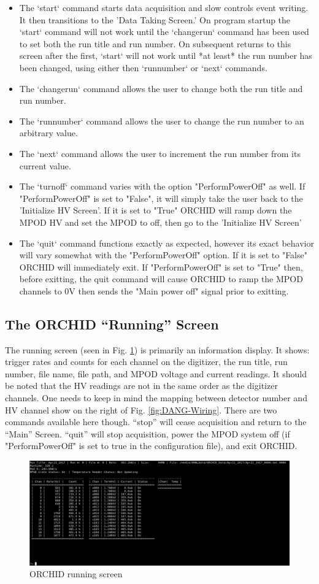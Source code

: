 \documentclass[onecolumn, 10pt, letterpaper, twoside]{article}
\begin{document}
\begin{itemize}
\item The `start` command starts data acquisition and slow controls event writing. It then transitions to the 'Data Taking Screen.' On program startup the `start` command will not work until the `changerun` command has been used to set both the run title and run number. On subsequent returns to this screen after the first, `start` will not work until *at least* the run number has been changed, using either then `runnumber` or `next` commands.
\item The `changerun` command allows the user to change both the run title and run number.
\item The `runnumber` command allows the user to change the run number to an arbitrary value.
\item The `next` command allows the user to increment the run number from its current value.
\item The `turnoff` command varies with the option "PerformPowerOff" as well. If "PerformPowerOff" is set to "False", it will simply take the user back to the 'Initialize HV Screen'. If it is set to "True" ORCHID will ramp down the MPOD HV and set the MPOD to off, then go to the 'Initialize HV Screen'
\item The `quit` command functions exactly as expected, however its exact behavior will vary somewhat with the "PerformPowerOff" option. If it is set to "False" ORCHID will immediately exit. If "PerformPowerOff" is set to "True" then, before exitting, the quit command will cause ORCHID to ramp the MPOD channels to 0V then sends the "Main power off" signal prior to exitting.
\end{itemize}

\subsection{The ORCHID ``Running'' Screen}
The running screen (seen in Fig. \ref{fig:ORCHID_Running}) is primarily an information display. It shows: trigger rates and counts for each channel on the digitizer, the run title, run number, file name, file path, and MPOD voltage and current readings. It should be noted that the HV readings are not in the same order as the digitizer channels. One needs to keep in mind the mapping between detector number and HV channel show on the right of Fig. \ref{fig:DANG-Wiring}. There are two commands available here though. ``stop'' will cease acquisition and return to the ``Main'' Screen. ``quit'' will stop acquisition, power the MPOD system off (if "PerformPowerOff" is set to true in the configuration file), and exit ORCHID.

\begin{figure}[h!]
\begin{center}
\includegraphics[width=\textwidth]{./img/Running_Screen.png}
\caption{ORCHID running screen}
\label{fig:ORCHID_Running}
\end{center}
\end{figure}
\end{document}
